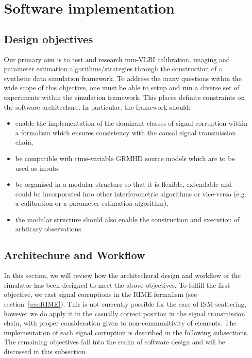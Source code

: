 \chapter{Software implementation}\label{chap:imp}

\section{Design objectives}\label{sec:des_obj}
Our primary aim is to test and research mm-VLBI calibration, imaging and parameter estimation algorithms/strategies through the construction of a synthetic data simulation framework. To address the many questions within the wide scope of this objective, one must be able to setup and run a diverse set of experiments within the simulation framework. This places definite constraints on the software architechure. In particular, the framework should:


\begin{itemize}
 \item enable the implementation of the dominant classes of signal corruption within a formalism which ensures consistency with the causal signal transmission chain,
 \item be compatible with time-variable GRMHD source models which are to be used as inputs,
 \item be organised in a modular structure so that it is flexible, extendable and could be incorporated into other interferometric algorithms or vice-versa (e.g. a calibration or a parameter estimation algorithm),
 \item the modular structure should also enable the construction and execution of arbitrary observations.
\end{itemize}

\section{Architechure and Workflow}\label{sec:arch}
In this section, we will review how the architechural design and workflow of the simulator has been designed to meet the above objectives. To fulfill the first objective, we cast signal corruptions in the RIME formalism (see section~\ref{sec:RIME}). This is not currently possible for the case of ISM-scattering, however we do apply it in the casually correct position in the signal transmission chain, with proper consideration given to non-communitivity of elements. The implementation of each signal corruption is described in the following subsections. The remaining objectives fall into the realm of software design and will be discussed in this subsection. 



